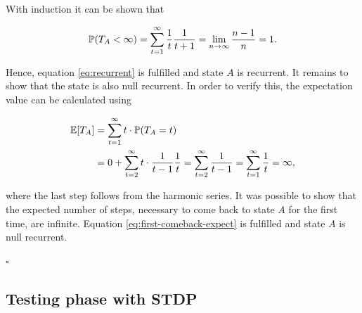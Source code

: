With induction it can be shown that

\begin{equation}
\mathbb{P}(T_A < \infty) = \sum_{t=1}^\infty \frac{1}{t} \frac{1}{t+1} = \lim_{n \to\infty} \frac{n-1}{n} = 1.
\end{equation}

Hence, equation \eqref{eq:recurrent} is fulfilled and state $A$ is recurrent. It remains to show that the state is also null recurrent. In order to verify this, the expectation value can be calculated using

\begin{equation}
\begin{split}
\mathbb{E}[T_A] &= \sum_{t=1}^\infty t \cdot \mathbb{P}(T_A = t)\\
&= 0 + \sum_{t=2}^\infty t \cdot \frac{1}{t-1} \frac{1}{t} = \sum_{t=2}^\infty \frac{1}{t-1} = \sum_{t=1}^\infty \frac{1}{t} = \infty,
\end{split}
\end{equation}

where the last step follows from the harmonic series. It was possible to show that the expected number of steps, necessary to come back to state $A$ for the first time, are infinite. Equation \eqref{eq:first-comeback-expect} is fulfilled and state $A$ is null recurrent.

\hfill$\square$

\newpage

\subsection{Testing phase with STDP}
\label{sec:appendix:stdp}

